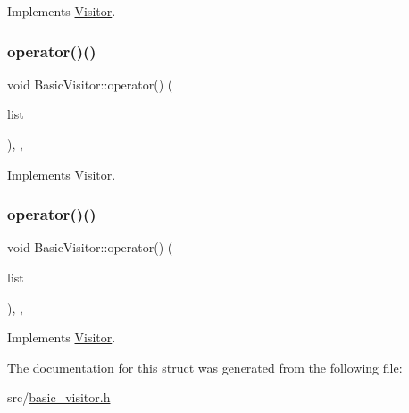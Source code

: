 Implements \hyperlink{struct_visitor_a6042d08a4d52ec6d3cd76251c88c5202}{Visitor}.

\mbox{\label{struct_basic_visitor_a4cb8f522aa48db2270e3af61ee7b3370}} 
\subsubsection{\texorpdfstring{operator()()}{operator()()}\hspace{0.1cm}{\footnotesize\ttfamily [59/60]}}
{\footnotesize\ttfamily void Basic\+Visitor\+::operator() (\begin{DoxyParamCaption}\item[{const \hyperlink{struct_source_elements}{Source\+Elements} \&}]{list }\end{DoxyParamCaption})\hspace{0.3cm}{\ttfamily [inline]}, {\ttfamily [override]}, {\ttfamily [virtual]}}



Implements \hyperlink{struct_visitor_ad9a1464cbbd0ab4e528ac4d22c056647}{Visitor}.

\mbox{\label{struct_basic_visitor_a3ce54960164c84e8d61c4c710362d6e3}} 
\subsubsection{\texorpdfstring{operator()()}{operator()()}\hspace{0.1cm}{\footnotesize\ttfamily [60/60]}}
{\footnotesize\ttfamily void Basic\+Visitor\+::operator() (\begin{DoxyParamCaption}\item[{const \hyperlink{struct_formal_parameter_list}{Formal\+Parameter\+List} \&}]{list }\end{DoxyParamCaption})\hspace{0.3cm}{\ttfamily [inline]}, {\ttfamily [override]}, {\ttfamily [virtual]}}



Implements \hyperlink{struct_visitor_a1481a506dd79cc99d06ea9ebd2ac08ad}{Visitor}.



The documentation for this struct was generated from the following file\+:\begin{DoxyCompactItemize}
\item 
src/\hyperlink{basic__visitor_8h}{basic\+\_\+visitor.\+h}\end{DoxyCompactItemize}
